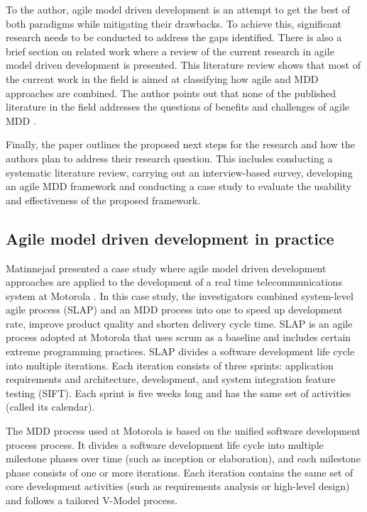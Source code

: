 \documentclass[10pt, a4paper, twocolumn]{article}
\begin{document}
To the author, agile model driven development is an attempt to get the best of both paradigms while mitigating their drawbacks. To achieve this, significant research needs to be conducted to address the gaps identified. There is also a brief section on related work where a review of the current research in agile model driven development is presented. This literature review shows that most of the current work in the field is aimed at classifying how agile and MDD approaches are combined. The author points out that none of the published literature in the field addresses the questions of benefits and challenges of agile MDD \cite{matinnejad2011agile,stavru2013challenges,whittle2014state}.

Finally, the paper outlines the proposed next steps for the research and how the authors plan to address their research question. This includes conducting a systematic literature review, carrying out an interview-based survey, developing an agile MDD framework and conducting a case study to evaluate the usability and effectiveness of the proposed framework.

\subsection{Agile model driven development in practice}

Matinnejad \cite{matinnejad2011agile} presented a case study where agile model driven development approaches are applied to the development of a real time telecommunications system at Motorola \cite{zhang2011agile}. In this case study, the investigators combined system-level agile process (SLAP) and an MDD process into one to speed up development rate, improve product quality and shorten delivery cycle time. SLAP is an agile process adopted at Motorola that uses scrum as a baseline and includes certain extreme programming practices. SLAP divides a software development life cycle into multiple iterations. Each iteration consists of three sprints: application requirements and architecture, development, and system integration feature testing (SIFT). Each sprint is five weeks long and has the same set of activities (called its calendar). 


The MDD process used at Motorola is based on the unified software development process process. It divides a software development life cycle into multiple milestone phases over time (such as inception or elaboration), and each milestone phase consists of one or more iterations. Each iteration contains the same set of core development activities (such as requirements analysis or high-level design) and follows a tailored V-Model process.
\end{document}
